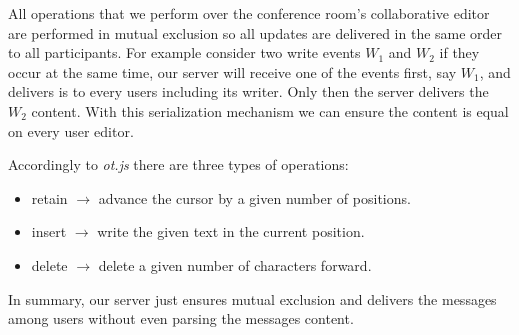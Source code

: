 All operations that we perform over the conference room's collaborative editor are performed in mutual exclusion so all updates are delivered in the same order to all participants. For example consider two write events $W_1$ and $W_2$ if they occur at the same time, our server will receive one of the events first, say $W_1$, and delivers is to every users including its writer. Only then the server delivers the $W_2$ content. With this serialization mechanism we can ensure the content is equal on every user editor.

Accordingly to \emph{ot.js} there are three types of operations:
\begin{itemize}
\item{retain} $\rightarrow$ advance the cursor by a given number of positions.
\item{insert} $\rightarrow$ write the given text in the current position.
\item{delete} $\rightarrow$ delete a given number of characters forward.
\end{itemize}

In summary, our server just ensures mutual exclusion and delivers the messages among users without even parsing the messages content.
